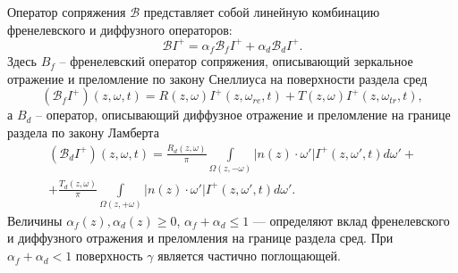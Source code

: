 \documentclass[12pt,reqno]{report}
\begin{document}
Оператор сопряжения $\mathcal B$ представляет собой линейную комбинацию френелевского и диффузного операторов:
\begin{equation}
\mathcal BI^+ = \alpha_f \mathcal B_{f}I^+ + \alpha_d \mathcal
B_{d}I^+.
\end{equation}
Здесь  $B_{f}$ --  френелевский оператор сопряжения, описывающий зеркальное отражение и преломление по закону Снеллиуса на поверхности раздела сред  \cite{20,22,29,31,33}
\begin{equation}
(\mathcal B_{f}I^+)(z,\omega,t) = R(z,\omega)
I^+(z,\omega_{re},t) + T(z,\omega) I^+(z,\omega_{tr},t),
\end{equation}
а         $B_{d}$ --  оператор, описывающий диффузное отражение и преломление \cite{30,32} на границе раздела  по закону Ламберта  
\begin{multline}
(\mathcal B_d I^+)(z,\omega,t) = \frac{R_d (z,\omega)}{\pi}\int
\limits_{\Omega(z,-\omega)}|n(z)\cdot \omega'| I^+(z,\omega',t)d
\omega' + \\+ \frac{T_d (z,\omega)}{\pi} \int
\limits_{\Omega(z,+\omega)}|n(z)\cdot \omega'| I^+(z,\omega',t) d
\omega'.
\end{multline}
Величины $ \alpha_f(z),\alpha_d(z) \geq 0$, $ \alpha_f +\alpha_d \leq 1$  --- определяют вклад френелевского и диффузного отражения и преломления на  границе раздела сред. При  $\alpha_f +\alpha_d < 1$  поверхность $\gamma$ является частично
поглощающей.
\end{document}
